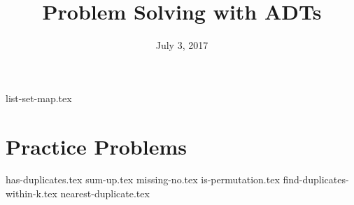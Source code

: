 \documentclass{exam}
\title{Problem Solving with ADTs}
\date{July 3, 2017}
\begin{document}
\maketitle

{list-set-map.tex}

\clearpage

\section{Practice Problems}
\begin{questions}
{has-duplicates.tex}
{sum-up.tex}
\clearpage
{missing-no.tex}
{is-permutation.tex}
\clearpage
{find-duplicates-within-k.tex}
\clearpage
{nearest-duplicate.tex}
\end{questions}
\end{document}
